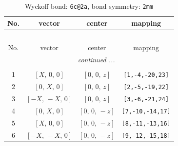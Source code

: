 \documentclass[fleqn,8pt]{jsarticle}
\begin{document}
\begin{longtable}{cccc}
\caption{Wyckoff bond: {\tt 6c@2a}, bond symmetry: {\tt 2mm}}
 \\
 \hline \hline
No. & vector & center & mapping \\ \hline \endfirsthead

\multicolumn{3}{l}{\tablename\ \thetable{}} \\
 \hline \hline
No. & vector & center & mapping \\ \hline \endhead

 \hline \hline
\multicolumn{3}{r}{\footnotesize\it continued ...} \\ \endfoot

 \hline \hline
\multicolumn{3}{r}{} \\ \endlastfoot

1 & $\left[ X,\, 0,\, 0 \right]$ & $\left[ 0,\, 0,\, z \right]$ & {\tt [1,-4,-20,23]} \\ \hline
2 & $\left[ 0,\, X,\, 0 \right]$ & $\left[ 0,\, 0,\, z \right]$ & {\tt [2,-5,-19,22]} \\ \hline
3 & $\left[ - X,\, - X,\, 0 \right]$ & $\left[ 0,\, 0,\, z \right]$ & {\tt [3,-6,-21,24]} \\ \hline
4 & $\left[ 0,\, X,\, 0 \right]$ & $\left[ 0,\, 0,\, - z \right]$ & {\tt [7,-10,-14,17]} \\ \hline
5 & $\left[ X,\, 0,\, 0 \right]$ & $\left[ 0,\, 0,\, - z \right]$ & {\tt [8,-11,-13,16]} \\ \hline
6 & $\left[ - X,\, - X,\, 0 \right]$ & $\left[ 0,\, 0,\, - z \right]$ & {\tt [9,-12,-15,18]} \\
\end{longtable}
\renewcommand{\arraystretch}{1.2}
\end{document}
